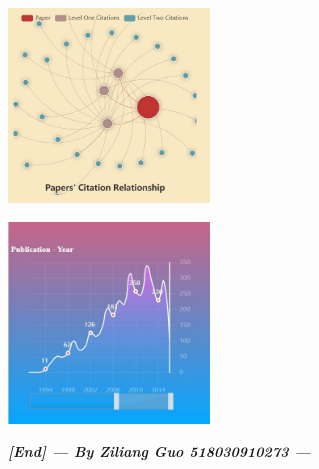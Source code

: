 \documentclass[10pt,twoside,a4paper,titlepage]{article}
\begin{document}
		\includegraphics[width=0.4\textwidth]{gjl/22.jpg}\newline\par
		\includegraphics[width=0.4\textwidth]{gjl/3.jpg}\newline\par

		\textbf{\emph{[End] --- By Ziliang Guo 518030910273 ---}}

		


\newpage


\end{document}

